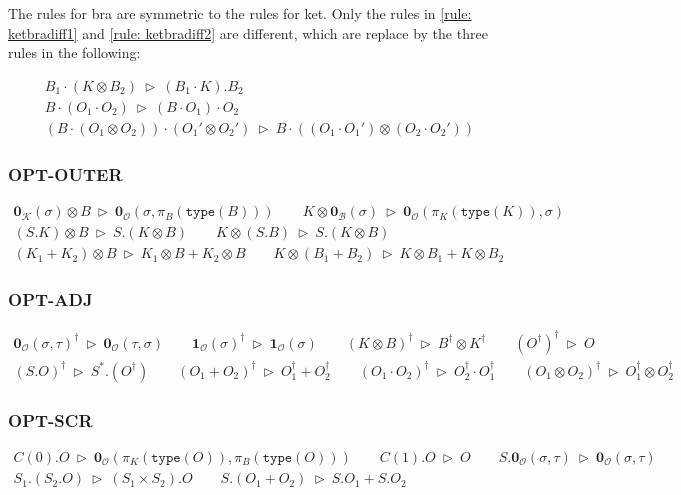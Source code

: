 \documentclass[manuscript, review, timestamp]{acmart}
\newcommand*{\type}{\texttt{type}}
\newcommand*{\reduce}{\ \triangleright\ }
\begin{document}
The rules for bra are symmetric to the rules for ket. Only the rules in \ref{rule: ketbradiff1} and \ref{rule: ketbradiff2} are different, which are replace by the three rules in the following:

\begin{gather*}
  B_1 \cdot (K \otimes B_2) \reduce (B_1 \cdot K).B_2 \\
  B \cdot (O_1 \cdot O_2) \reduce (B \cdot O_1) \cdot O_2 \\
  (B \cdot (O_1 \otimes O_2)) \cdot (O_1' \otimes O_2') \reduce B \cdot ((O_1 \cdot O_1') \otimes (O_2 \cdot O_2'))
\end{gather*}

\subsubsection*{\textsf{OPT-OUTER}}
\begin{gather*}
  \mathbf{0}_\mathcal{K}(\sigma) \otimes B \reduce \mathbf{0}_\mathcal{O}(\sigma, \pi_B(\type(B)))
  \qquad
  K \otimes \mathbf{0}_\mathcal{B}(\sigma) \reduce \mathbf{0}_\mathcal{O}(\pi_K(\type(K)), \sigma) \\
  (S.K) \otimes B \reduce S.(K \otimes B)
  \qquad
  K \otimes (S.B) \reduce S.(K \otimes B) \\
  (K_1 + K_2) \otimes B \reduce K_1 \otimes B + K_2 \otimes B
  \qquad
  K \otimes (B_1 + B_2) \reduce K \otimes B_1 + K \otimes B_2
\end{gather*}


\subsubsection*{\textsf{OPT-ADJ}}
\begin{gather*}
  \textbf{0}_\mathcal{O}(\sigma, \tau)^\dagger \reduce \textbf{0}_\mathcal{O}(\tau, \sigma)
  \qquad
  \textbf{1}_\mathcal{O}(\sigma)^\dagger \reduce \textbf{1}_\mathcal{O}(\sigma)
  \qquad
  (K \otimes B)^\dagger \reduce B^\dagger \otimes K^\dagger
  \qquad
  (O^\dagger)^\dagger \reduce O \\
  (S.O)^\dagger \reduce S^*.(O^\dagger)
  \qquad
  (O_1 + O_2)^\dagger \reduce O_1^\dagger + O_2^\dagger
  \qquad
  (O_1 \cdot O_2)^\dagger \reduce O_2^\dagger \cdot O_1^\dagger
  \qquad
  (O_1 \otimes O_2)^\dagger \reduce O_1^\dagger \otimes O_2^\dagger
\end{gather*}

\subsubsection*{\textsf{OPT-SCR}}
\begin{gather*}
  C(0).O \reduce \mathbf{0}_\mathcal{O}(\pi_K(\type(O)), \pi_B(\type(O)))
  \qquad
  C(1).O \reduce O
  \qquad
  S.\textbf{0}_\mathcal{O}(\sigma, \tau) \reduce \textbf{0}_\mathcal{O}(\sigma, \tau) \\
  S_1.(S_2.O) \reduce (S_1 \times S_2).O
  \qquad
  S.(O_1 + O_2) \reduce S.O_1 + S.O_2
\end{gather*}
\end{document}
